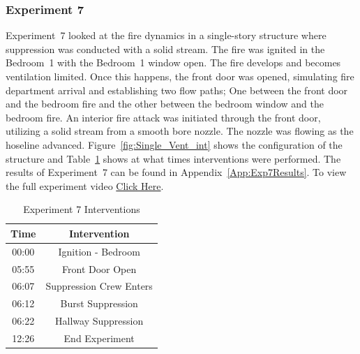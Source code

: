 \documentclass[12pt,oneside]{book}
\begin{document}
\FloatBarrier

\subsubsection{Experiment 7}
Experiment~7 looked at the fire dynamics in a single-story structure where suppression was conducted with a solid stream. The fire was ignited in the Bedroom~1 with the Bedroom~1 window open. The fire develops and becomes ventilation limited. Once this happens, the front door was opened, simulating fire department arrival and establishing two flow paths; One between the front door and the bedroom fire and the other between the bedroom window and the bedroom fire. An interior fire attack was initiated through the front door, utilizing a solid stream from a smooth bore nozzle. The nozzle was flowing as the hoseline advanced. Figure~\ref{fig:Single_Vent_int} shows the configuration of the structure and Table~\ref{Table:Exp7Interventions} shows at what times interventions were performed. The results of Experiment~7 can be found in Appendix~\ref{App:Exp7Results}. To view the full experiment video \href{https://player.vimeo.com/video/170513517?autoplay=1}{Click Here}.

\begin{table}[H]
	\centering
	\caption{Experiment 7 Interventions}
	\begin{tabular}{|c|c|} 
		\hline
		Time & Intervention \\ \hline \hline
		00:00 & Ignition - Bedroom \\ \hline
		05:55 & Front Door Open \\ \hline
		06:07 & Suppression Crew Enters\\ \hline
		06:12 & Burst Suppression \\ \hline 
		06:22 & Hallway Suppression \\ \hline
		12:26 & End Experiment\\ \hline
	\end{tabular}
	\label{Table:Exp7Interventions}
\end{table}

\FloatBarrier
\end{document}
